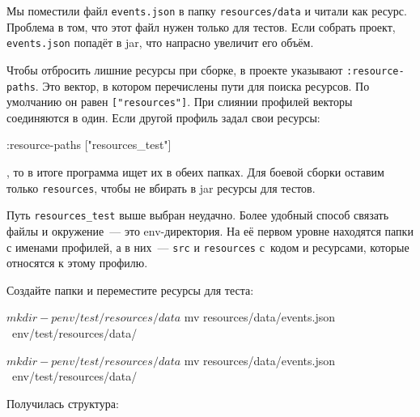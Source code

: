 Мы поместили файл \verb|events.json| в папку \verb|resources/data| и читали как
ресурс. Проблема в том, что этот файл нужен только для тестов. Если собрать
проект, \verb|events.json| попадёт в jar, что напрасно увеличит его объём.

Чтобы отбросить лишние ресурсы при сборке, в проекте указывают
\verb|:resource-paths|. Это вектор, в котором перечислены пути для поиска
ресурсов. По умолчанию он равен \verb|["resources"]|. При слиянии профилей
векторы соединяются в один. Если другой профиль задал свои ресурсы:

\begin{english}
  \begin{clojure}
:resource-paths ["resources_test"]
  \end{clojure}
\end{english}

\noindent
, то в итоге программа ищет их в обеих папках. Для боевой сборки оставим только
\verb|resources|, чтобы не вбирать в jar ресурсы для тестов.


Путь \verb|resources_test| выше выбран неудачно. Более удобный способ связать
файлы и окружение~--- это env-директория. На её первом уровне находятся папки с
именами профилей, а в них~--- \verb|src| и \verb|resources| с~кодом и ресурсами,
которые относятся к этому профилю.

Создайте папки и переместите ресурсы для теста:

\ifnarrow

\begin{english}
  \begin{bash}
$ mkdir -p env/test/resources/data
$ mv resources/data/events.json \
     env/test/resources/data/
  \end{bash}
\end{english}

\else

\begin{english}
  \begin{bash}
$ mkdir -p env/test/resources/data
$ mv resources/data/events.json \
     env/test/resources/data/
  \end{bash}
\end{english}

\fi

\noindent
Получилась структура:

\begin{english}
\end{english}

